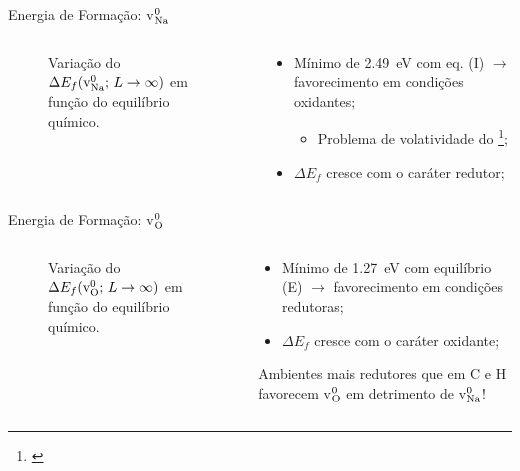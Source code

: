 \begin{frame}{Energia de Formação: \texorpdfstring{v$_{\ce{Na}}^{0}$}{vNa0}}
	\begin{columns}
		\begin{column}{.5\textwidth}
			\begin{figure}[t]
				\centering
				
				\caption{Variação do $\Delta E_f (\text{v}_{\ce{Na}}^{0};\, L \to \infty)$ em função do equilíbrio químico.\label{fig:energy_vac_na0}}
			\end{figure}
		\end{column}
		\begin{column}{.5\textwidth}
			\begin{itemize}
				\item Mínimo de \SI{2.49}{\electronvolt} com eq.  (I) $\to$ favorecimento em condições oxidantes;
				\begin{itemize}
					\item Problema de volatividade do \footnote[frame]{\cite{acker_microstructure_2014}};
				\end{itemize}
				\item $\Delta E_f$ cresce com o caráter redutor;
			\end{itemize}
		\end{column}
	\end{columns}
\end{frame}
\begin{frame}{Energia de Formação: \texorpdfstring{v$_{\ce{O}}^{0}$}{vO0}}
	\begin{columns}
		\begin{column}{.5\textwidth}
			\begin{figure}[t]
				\centering
				
				\caption{Variação do $\Delta E_f (\text{v}_{\ce{O}}^{0};\, L \to \infty)$ em função do equilíbrio químico.\label{fig:energy_vac_o0}}
			\end{figure}
		\end{column}
		\begin{column}{.5\textwidth}
			\begin{itemize}
				\item Mínimo de \SI{1.27}{\electronvolt} com equilíbrio  (E) $\to$ favorecimento em condições redutoras;
				\item $\Delta E_f$ cresce com o caráter oxidante;
			\end{itemize}
			\begin{center}
				\alert{Ambientes mais redutores que em C e H favorecem v$_{\ce{O}}^{0}$ em detrimento de v$_{\ce{Na}}^{0}$!}
			\end{center}
		\end{column}
	\end{columns}
\end{frame}
